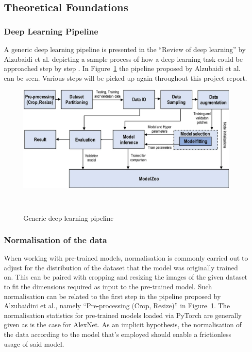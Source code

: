 \subsection{Theoretical Foundations}\label{foundations}


\subsubsection{Deep Learning Pipeline}
A generic deep learning pipeline is presented in the ``Review of deep learning'' by Alzubaidi et al\@. depicting a sample process of how a deep learning task could be approached step by step \citep{alzubaidi2021review}. In Figure~\ref{fig:pipeline} the pipeline proposed by Alzubaidi et al\@. can be seen. Various steps will be picked up again throughout this project report.
\begin{figure}[h]
	\centering
	\includegraphics[scale=0.275]{./figures/Pipeline.png}
	\caption{Generic deep learning pipeline}~\label{fig:pipeline}
\end{figure}



\subsubsection{Normalisation of the data}
When working with pre-trained models, normalisation is commonly carried out to adjust for the distribution of the dataset that the model was originally trained on. This can be paired with cropping and resizing the images of the given dataset to fit the dimensions required as input to the pre-trained model. Such normalisation can be related to the first step in the pipeline proposed by Alzubaidini et al., namely  ``Pre-processing (Crop, Resize)'' in Figure~\ref{fig:pipeline}. The normalisation statistics for pre-trained models loaded via PyTorch are generally given as is the case for AlexNet\citep{pytorchAlexNet}. As an implicit hypothesis, the normalisation of the data according to the model that's employed should enable a frictionless usage of said model.


